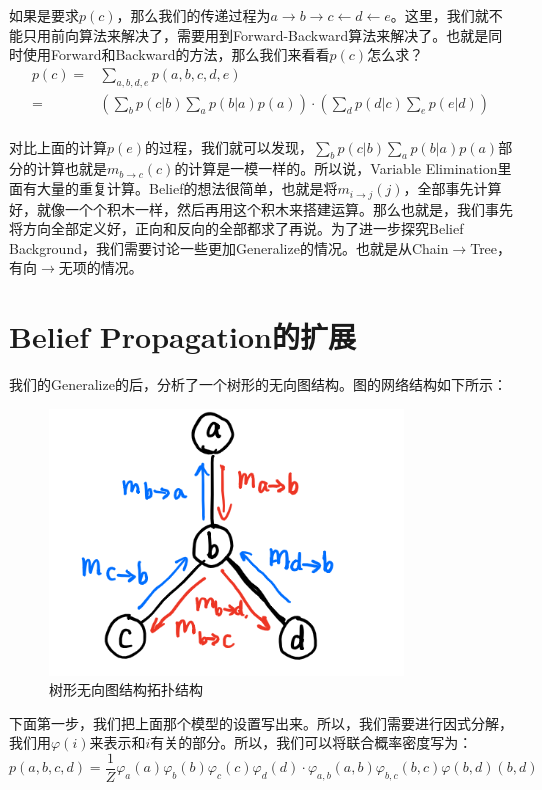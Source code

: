 \documentclass[a4paper]{article}
\begin{document}
如果是要求$p(c)$，那么我们的传递过程为$a\longrightarrow b \longrightarrow c \longleftarrow d \longleftarrow e$。这里，我们就不能只用前向算法来解决了，需要用到Forward-Backward算法来解决了。也就是同时使用Forward和Backward的方法，那么我们来看看$p(c)$怎么求？
\begin{equation}
    \begin{split}
        p(c) 
        = & \sum_{a,b,d,e}p(a,b,c,d,e) \\
        = & (\sum_b p(c|b)\sum_a p(b|a)p(a)) \cdot (\sum_d p(d|c)\sum_e p(e|d)) \\
    \end{split}
\end{equation}

对比上面的计算$p(e)$的过程，我们就可以发现，$\sum_b p(c|b)\sum_a p(b|a)p(a)$部分的计算也就是$m_{b\longrightarrow c}(c)$的计算是一模一样的。所以说，Variable Elimination里面有大量的重复计算。Belief的想法很简单，也就是将$m_{i\longrightarrow j}(j)$，全部事先计算好，就像一个个积木一样，然后再用这个积木来搭建运算。那么也就是，我们事先将方向全部定义好，正向和反向的全部都求了再说。为了进一步探究Belief Background，我们需要讨论一些更加Generalize的情况。也就是从Chain$\longrightarrow$Tree，有向$\longrightarrow$无项的情况。

\section{Belief Propagation的扩展}
我们的Generalize的后，分析了一个树形的无向图结构。图的网络结构如下所示：
\begin{figure}[H]
    \centering
    \includegraphics[width=.35\textwidth]{微信图片_20191208145754.png}
    \caption{树形无向图结构拓扑结构}
    \label{fig:my_label_1}
\end{figure}

下面第一步，我们把上面那个模型的设置写出来。所以，我们需要进行因式分解，我们用$\varphi(i)$来表示和$i$有关的部分。所以，我们可以将联合概率密度写为：
\begin{equation}
    p(a,b,c,d) = \frac{1}{Z} \varphi_a(a)\varphi_b(b)\varphi_c(c)\varphi_d(d)\cdot \varphi_{a,b}(a,b)\varphi_{b,c}(b,c)\varphi(b,d)(b,d)
\end{equation}
\end{document}
